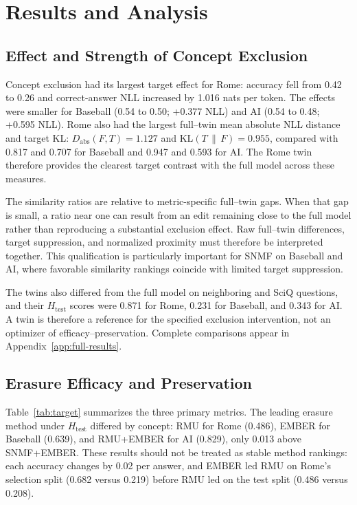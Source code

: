 \section{Results and Analysis}
\label{sec:results}

\subsection{Effect and Strength of Concept Exclusion}

Concept exclusion had its largest target effect for Rome: accuracy fell from
0.42 to 0.26 and correct-answer NLL increased by 1.016 nats per token. The
effects were smaller for Baseball (0.54 to 0.50; +0.377 NLL) and AI (0.54 to
0.48; +0.595 NLL). Rome also had the largest full--twin mean absolute NLL
distance and target KL: $D_{\mathrm{abs}}(F,T)=1.127$ and
$\mathrm{KL}(T\,\|\,F)=0.955$, compared with 0.817 and 0.707 for Baseball and
0.947 and 0.593 for AI. The Rome twin therefore provides the clearest target
contrast with the full model across these measures.

The similarity ratios are relative to metric-specific full--twin gaps. When
that gap is small, a ratio near one can result from an edit remaining close to
the full model rather than reproducing a substantial exclusion effect. Raw
full--twin differences, target suppression, and normalized proximity must
therefore be interpreted together. This qualification is particularly
important for SNMF on Baseball and AI, where favorable similarity rankings
coincide with limited target suppression.

The twins also differed from the full model on neighboring and SciQ questions,
and their $H_{\mathrm{test}}$ scores were 0.871 for Rome, 0.231 for Baseball,
and 0.343 for AI. A twin is therefore a reference for the specified exclusion
intervention, not an optimizer of efficacy--preservation. Complete comparisons
appear in Appendix~\ref{app:full-results}.

\subsection{Erasure Efficacy and Preservation}

Table~\ref{tab:target} summarizes the three primary metrics. The leading erasure
method under $H_{\mathrm{test}}$ differed by concept: RMU for Rome (0.486),
EMBER for Baseball (0.639), and RMU+EMBER for AI (0.829), only 0.013 above
SNMF+EMBER. These results should not be treated as stable method rankings:
each accuracy changes by 0.02 per answer, and EMBER led RMU on Rome's
selection split (0.682 versus 0.219) before RMU led on the test split (0.486
versus 0.208).

